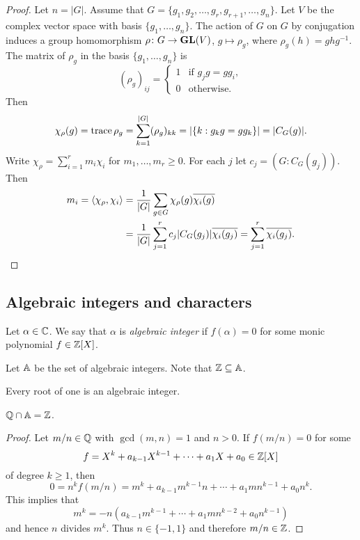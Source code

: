 \begin{proof}
    Let $n=|G|$. 
    Assume that $G=\{g_1,g_2,\dots,g_r,g_{r+1},\dots,g_n\}$. 
    Let $V$ be the complex vector space with basis $\{g_1,\dots,g_n\}$. 
    The action of $G$ on $G$ by conjugation induces a group homomorphism 
    $\rho\colon G\to\mathbf{GL}(V)$, $g\mapsto\rho_g$, where
    $\rho_g(h)=ghg^{-1}$. The matrix of $\rho_g$ 
    in the basis $\{g_1,\dots,g_n\}$ is
    \[
    (\rho_g)_{ij}=\begin{cases}
        1 & \text{if $g_jg=gg_i$},\\
        0 & \text{otherwise}.
        \end{cases}
    \]
    Then
    \[
    \chi_{\rho}(g)=\operatorname{trace}\rho_g=\sum_{k=1}^{|G|}(\rho_g)_{kk}
    =|\{k:g_kg=gg_k\}|=|C_G(g)|.
    \]
    Write $\chi_{\rho}=\sum_{i=1}^rm_i\chi_i$ for $m_1,\dots,m_r\geq0$. 
    For each $j$ let $c_j=(G:C_G(g_j))$. Then
    \begin{align*}
    m_i=\langle\chi_{\rho},\chi_i\rangle
    &=\frac{1}{|G|}\sum_{g\in G}\chi_{\rho}(g)\overline{\chi_i(g)}\\
    &=\frac{1}{|G|}\sum_{j=1}^r c_j|C_G(g_j)|\overline{\chi_i(g_j)}
    =\sum_{j=1}^r\overline{\chi_i(g_j)}.\qedhere
    \end{align*}
\end{proof}

\subsection{Algebraic integers and characters}

\begin{definition}
\label{Algebraic integer}
    Let $\alpha\in\mathbb{C}$. We say that $\alpha$ is \emph{algebraic integer}
    if $f(\alpha)=0$ for some monic polynomial $f\in\mathbb{Z}[X]$. 
\end{definition}

Let $\mathbb{A}$ be the set of algebraic integers. Note that $\mathbb{Z}\subseteq\mathbb{A}$. 

\begin{example}
    Every root of one is an algebraic integer.
\end{example}

\begin{proposition}
    $\mathbb{Q}\cap\mathbb{A}=\mathbb{Z}$. 
\end{proposition}

\begin{proof}
    Let $m/n\in\mathbb{Q}$ with $\gcd(m,n)=1$ and $n>0$. If 
    $f(m/n)=0$ for some 
    \[
    f=X^k+a_{k-1}X^{k-1}+\cdots+a_1X+a_0\in\mathbb{Z}[X]
    \]
    of degree $k\geq1$, then
    \[
    0=n^kf(m/n)=m^k+a_{k-1}m^{k-1}n+\cdots+a_1mn^{k-1}+a_0n^k.
    \]
    This implies that 
    \[
        m^k=-n\left(a_{k-1}m^{k-1}+\cdots+a_1mn^{k-2}+a_0n^{k-1}\right)
    \]
    and hence $n$ divides $m^k$. Thus $n\in\{-1,1\}$ and 
    therefore $m/n\in\mathbb{Z}$.
\end{proof}

